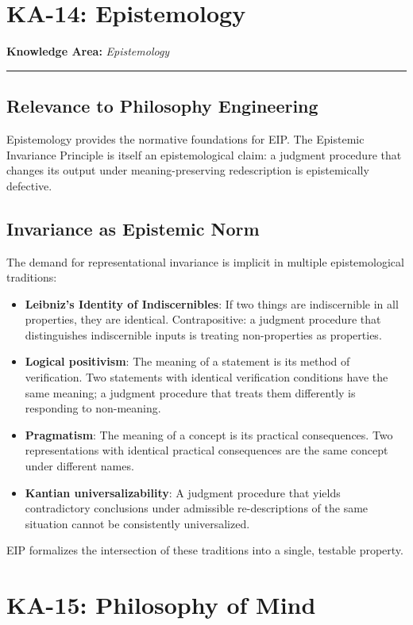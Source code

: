 \documentclass[12pt,letterpaper]{article}
\theoremstyle{definition}
\theoremstyle{plain}
\newcommand{\ka}[1]{\vspace{1em}\noindent\textbf{\large Knowledge Area:} \textit{#1}\vspace{0.5em}\hrule\vspace{0.5em}}
\begin{document}
\section{KA-14: Epistemology}
\label{sec:ka14}

\ka{Epistemology}

\subsection{Relevance to Philosophy Engineering}

Epistemology provides the normative foundations for EIP. The Epistemic Invariance Principle is itself an epistemological claim: a judgment procedure that changes its output under meaning-preserving redescription is epistemically defective.

\subsection{Invariance as Epistemic Norm}

The demand for representational invariance is implicit in multiple epistemological traditions:
\begin{itemize}
    \item \textbf{Leibniz's Identity of Indiscernibles}: If two things are indiscernible in all properties, they are identical. Contrapositive: a judgment procedure that distinguishes indiscernible inputs is treating non-properties as properties.
    \item \textbf{Logical positivism}: The meaning of a statement is its method of verification. Two statements with identical verification conditions have the same meaning; a judgment procedure that treats them differently is responding to non-meaning.
    \item \textbf{Pragmatism}: The meaning of a concept is its practical consequences. Two representations with identical practical consequences are the same concept under different names.
    \item \textbf{Kantian universalizability}: A judgment procedure that yields contradictory conclusions under admissible re-descriptions of the same situation cannot be consistently universalized.
\end{itemize}

EIP formalizes the intersection of these traditions into a single, testable property.


\section{KA-15: Philosophy of Mind}
\label{sec:ka15}
\end{document}
